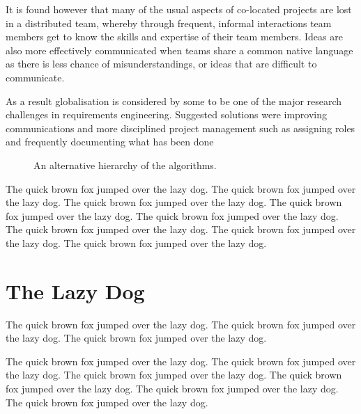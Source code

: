 \documentclass{l4proj}
\begin{document}
It is found however that many of the usual aspects of co-located projects are lost in a distributed team, whereby through frequent, informal interactions team members get to know the skills and expertise of their team members.  Ideas are also more effectively communicated when teams share a common native language as there is less chance of misunderstandings, or ideas that are difficult to communicate.

As a result globalisation is considered by some to be one of the major research challenges in requirements engineering.  Suggested solutions were improving communications and more disciplined project management such as assigning roles and frequently documenting what has been done







\begin{figure}
\centering
\vspace{-30mm}
\caption{An alternative hierarchy of the algorithms.}
\label{uroborus}
\end{figure}

The quick brown fox jumped over the lazy dog.
The quick brown fox jumped over the lazy dog.
The quick brown fox jumped over the lazy dog.
The quick brown fox jumped over \cite{ckt} the lazy dog.
The quick brown fox jumped over the lazy dog.
The quick brown fox jumped over the lazy dog.
The quick brown fox jumped over the lazy dog.
The quick brown fox jumped over the lazy dog.

\section{The Lazy Dog}
The quick brown fox jumped over the lazy dog.
The quick brown fox jumped over the lazy dog.
The quick brown fox jumped over the lazy dog.

The quick brown fox jumped over the lazy dog.
The quick brown fox \cite{am97} jumped over the lazy dog.
The quick brown fox jumped over the lazy dog.
The quick brown fox jumped over the lazy dog.
The quick brown fox jumped over the lazy dog.
The quick brown fox jumped over the lazy dog.
\end{document}
